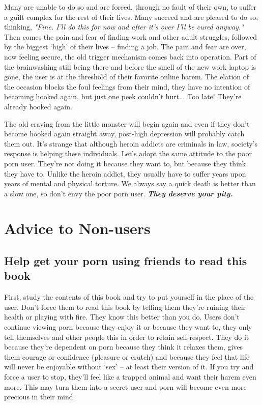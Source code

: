\documentclass[
]{book}
\begin{document}
Many are unable to do so and are forced, through no fault of their own, to suffer a guilt complex for the rest of their lives. Many succeed and are pleased to do so, thinking, \emph{"Fine. I'll do this for now and after it's over I'll be cured anyway."} Then comes the pain and fear of finding work and other adult struggles, followed by the biggest `high' of their lives -- finding a job. The pain and fear are over, now feeling secure, the old trigger mechanism comes back into operation. Part of the brainwashing still being there and before the smell of the new work laptop is gone, the user is at the threshold of their favorite online harem. The elation of the occasion blocks the foul feelings from their mind, they have no intention of becoming hooked again, but just one peek couldn't hurt... Too late! They're already hooked again.

The old craving from the little monster will begin again and even if they don't become hooked again straight away, post-high depression will probably catch them out. It's strange that although heroin addicts are criminals in law, society's response is helping these individuals. Let's adopt the same attitude to the poor porn user. They're not doing it because they want to, but because they think they have to. Unlike the heroin addict, they usually have to suffer years upon years of mental and physical torture. We always say a quick death is better than a slow one, so don't envy the poor porn user. \textbf{\emph{They deserve your pity.}}

\hypertarget{advice-to-non-users}{%
\chapter{Advice to Non-users}\label{advice-to-non-users}}

\hypertarget{help-get-your-porn-using-friends-to-read-this-book}{%
\section{Help get your porn using friends to read this book}\label{help-get-your-porn-using-friends-to-read-this-book}}

First, study the contents of this book and try to put yourself in the place of the user. Don't force them to read this book by telling them they're ruining their health or playing with fire. They know this better than you do. Users don't continue viewing porn because they enjoy it or because they want to, they only tell themselves and other people this in order to retain self-respect. They do it because they're dependent on porn because they think it relaxes them, gives them courage or confidence (pleasure or crutch) and because they feel that life will never be enjoyable without `sex' -- at least their version of it. If you try and force a user to stop, they'll feel like a trapped animal and want their harem even more. This may turn them into a secret user and porn will become even more precious in their mind.
\end{document}
